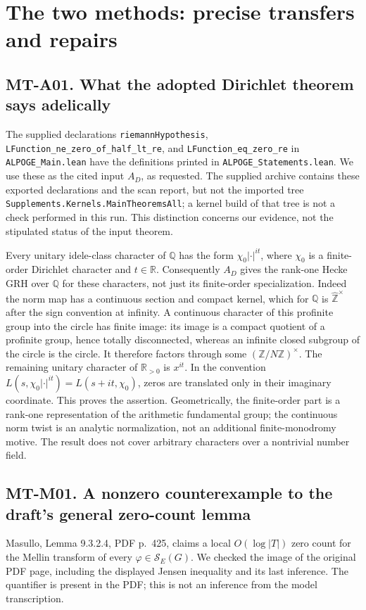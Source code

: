 \section{The two methods: precise transfers and repairs}
\label{sec:methods}

\subsection*{MT-A01. What the adopted Dirichlet theorem says adelically}
The supplied declarations \texttt{riemannHypothesis},
\texttt{LFunction\_ne\_zero\_of\_half\_lt\_re}, and
\texttt{LFunction\_eq\_zero\_re} in \texttt{ALPOGE\_Main.lean} have the
definitions printed in \texttt{ALPOGE\_Statements.lean}.  We use these as the
cited input $A_D$, as requested.  The supplied archive contains these exported
declarations and the scan report, but not the imported tree
\texttt{Supplements.Kernels.MainTheoremsAll}; a kernel build of that tree is
not a check performed in this run.  This distinction concerns our evidence,
not the stipulated status of the input theorem.

Every unitary idele-class character of $\mathbb Q$ has the form
$\chi_0|\cdot|^{it}$, where $\chi_0$ is a finite-order Dirichlet character
and $t\in\mathbb R$.  Consequently $A_D$ gives the rank-one Hecke GRH over
$\mathbb Q$ for these characters, not just its finite-order specialization.
Indeed the norm map has a continuous section and compact kernel, which for
$\mathbb Q$ is $\widehat{\mathbb Z}^{\times}$ after the sign convention at
infinity.  A continuous character of this profinite group into the circle has
finite image: its image is a compact quotient of a profinite group, hence
totally disconnected, whereas an infinite closed subgroup of the circle is
the circle.  It therefore factors through some
$(\mathbb Z/N\mathbb Z)^\times$.  The remaining unitary character of
$\mathbb R_{>0}$ is $x^{it}$.  In the convention
$L(s,\chi_0|\cdot|^{it})=L(s+it,\chi_0)$, zeros are translated only in
their imaginary coordinate.  This proves the assertion.  Geometrically,
the finite-order part is a rank-one representation of the arithmetic
fundamental group; the continuous norm twist is an analytic normalization,
not an additional finite-monodromy motive.  The result does not cover
arbitrary characters over a nontrivial number field.

\subsection*{MT-M01. A nonzero counterexample to the draft's general zero-count lemma}
Masullo, Lemma 9.3.2.4, PDF p.~425, claims a local $O(\log |T|)$ zero count
for the Mellin transform of every $\varphi\in\mathcal S_E(G)$.
We checked the image of the original PDF page, including the displayed
Jensen inequality and its last inference.  The quantifier is present in the
PDF; this is not an inference from the model transcription.

